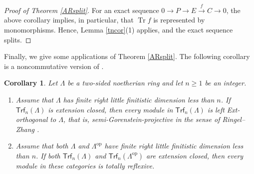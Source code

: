 \documentclass{amsart}
\newtheorem{cor}[thm]{Corollary}
\theoremstyle{definition}
\theoremstyle{remark}
\numberwithin{equation}{thm}
\def\ge{\geqslant}
\def\Trf{\mathsf{Trf}}
\def\tr{\operatorname{Tr}}
\begin{document}
\begin{proof}[Proof of Theorem \ref{ARsplit}]
For an exact sequence $0\to P\to E\xrightarrow{f}C\to0$, the above corollary implies, in particular, that $\tr f$ is represented by monomorphisms. Hence, Lemma \ref{tncor}(1) applies, and the exact sequence splits.
\end{proof}

Finally, we give some applications of Theorem \ref{ARsplit}. The following corollary is a noncommutative version of \cite[Theorem 1.3(2)]{DT}.

\begin{cor}\label{trfgproj}
Let $\Lambda$ be a two-sided noetherian ring and let $n\ge1$ be an integer.
\begin{enumerate}
\item Assume that $\Lambda$ has finite right little finitistic dimension less than $n$.
If $\Trf_n(\Lambda)$ is extension closed, then every module in $\Trf_n(\Lambda)$ is left Ext-orthogonal to $\Lambda$, that is, semi-Gorenstein-projective in the sense of Ringel--Zhang \cite{RZ1,RZ2}.
\item Assume that both $\Lambda$ and $\Lambda^{\mathrm{op}}$ have finite right little finitistic dimension less than $n$.
If both $\Trf_n(\Lambda)$ and $\Trf_n(\Lambda^{\mathrm{op}})$ are extension closed, then every module in these categories is totally reflexive.
\end{enumerate}
\end{cor}
\end{document}
